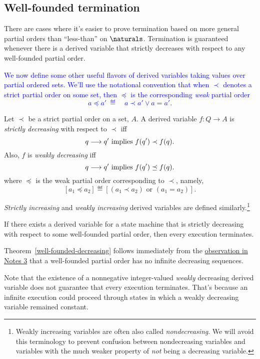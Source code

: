 \begin{editingnotes}
\section*{Well-founded termination}
There are cases where it's easier to prove termination based on more
general partial orders than ``less-than'' on $\naturals$.  Termination is
guaranteed whenever there is a derived variable that strictly decreases with
respect to any well-founded partial order.

\textcolor{blue}{
We now define some other useful flavors of derived variables taking values
over partial ordered sets.  We'll use the notational convention that when
$\prec$ denotes a strict partial order on some set, then $\preceq$ is the
corresponding \emph{weak} partial order
\[
a\preceq a' \ \eqdef\quad a \prec a' \lor a = a'.
\]
}

\begin{definition}
Let $\prec$ be a strict partial order on a set, $A$.  A derived variable
$f : Q \to A$ is \emph{strictly decreasing} with respect to $\prec$ iff
\[
q \mathrel{\longrightarrow} q' \text{ implies } f(q') \prec f(q).
\]
Also, $f$ is \emph{weakly decreasing} iff
\[
q \mathrel{\longrightarrow} q' \text{  implies  } f(q') \preceq f(q).
\]
where $\preceq$ is the weak partial order corresponding to $\prec$,
namely,
\[
[a_1 \preceq a_2] \eqdef [(a_1 \prec a_2) \text{ or } (a_1=a_2)].
\]

\emph{Strictly increasing} and \emph{weakly increasing} derived variables
are defined similarly.\footnote{Weakly increasing variables are often also
called \emph{nondecreasing}.  We will avoid this terminology to prevent
confusion between nondecreasing variables and variables with the much
weaker property of \emph{not} being a decreasing variable.}
\end{definition}

\begin{theorem}\label{well-founded-decreasing}
  If there exists a derived variable for a state machine that is strictly
  decreasing with respect to some well-founded partial order, then every
  execution terminates.
\end{theorem}

Theorem~\ref{well-founded-decreasing} follows immediately from the
\href{http://courses.csail.mit.edu/6.042/spring08/ln3.pdf#infinite.decreasing}
{observation in Notes 3} that a well-founded partial order has no infinite
decreasing sequences.

Note that the existence of a nonnegative integer-valued \emph{weakly}
decreasing derived variable does not guarantee that every execution
terminates.  That's because an infinite execution could proceed through
states in which a weakly decreasing variable remained constant.


\end{editingnotes}
